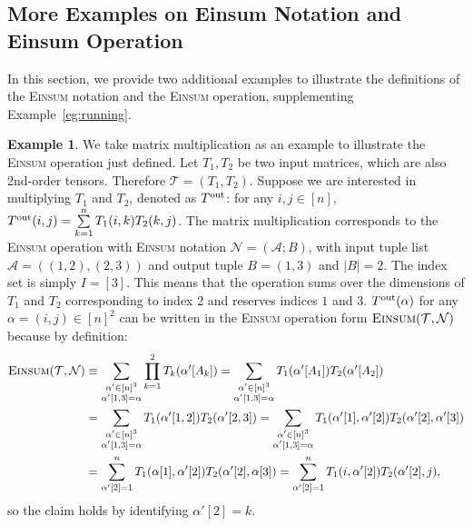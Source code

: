 \documentclass[12pt]{article}
\theoremstyle{plain}
\theoremstyle{definition}
\newtheorem{example}{Example}
\def\Einsum{\textsc{Einsum}}
\newcommand{\tensorcontraction}{\textsc{Einsum}}
\def\calA{\mathcal{A}}
\def\calT{\mathcal{T}}
\def\calN{\mathcal{N}}
\begin{document}
\begin{bibunit}[agsm]

\section{More Examples on Einsum Notation and Einsum Operation}
\label{app:examples}

In this section, we provide two additional examples to illustrate the definitions of the \Einsum{} notation and the \Einsum{} operation, supplementing Example~\ref{eg:running}.

\begin{example}
\label{eg:matrix multiplication}
We take matrix multiplication as an example to illustrate the \Einsum{} operation just defined. Let $T_1, T_2$ be two input matrices, which are also 2nd-order tensors. Therefore $\calT = (T_1, T_2)$. Suppose we are interested in multiplying $T_1$ and $T_2$, denoted as $T^{\rm out}$: for any $i, j \in [n]$, $T^{\rm out} (i, j) = \sum\limits_{k = 1}^n T_{1} (i, k) T_{2} (k, j)$. The matrix multiplication corresponds to the \Einsum{} operation with \Einsum{} notation $\calN = (\calA; B)$, with input tuple list $\calA = ((1,2),(2,3))$ and output tuple $B = (1,3)$ and $|B| = 2$. The index set is simply $I = [3]$. This means that the operation sums over the dimensions of $T_1$ and $T_2$ corresponding to index $2$ and reserves indices $1$ and $3$. $T^{\rm out} (\alpha)$ for any $\alpha = (i, j) \in  [n]^{2}$ can be written in the \Einsum{} operation form $\tensorcontraction(\calT, \calN)$ because by definition:
\begin{align*}
\tensorcontraction(\calT, \calN) & \equiv \sum_{\substack{\alpha'  \in [n]^3 \\ \alpha' [1, 3] = \alpha}} \prod_{k = 1}^{2} T_k (\alpha' [A_k]) = \sum_{\substack{\alpha' 
\in [n]^3 \\ \alpha' [1, 3] = \alpha}} T_1 (\alpha' [A_1]) T_2 (\alpha' [A_2]) \\
& = \sum_{\substack{\alpha'  \in [n]^3 \\ \alpha' [1, 3] = \alpha}} T_1 (\alpha' [1, 2]) T_2 (\alpha' [2, 3]) = \sum_{\substack{\alpha'  \in [n]^3 \\ \alpha' [1, 3] = \alpha}} T_1 (\alpha' [1], \alpha' [2]) T_2 (\alpha' [2], \alpha'[3]) \\
& = \sum_{\alpha' [2] = 1}^{n} T_{1} (\alpha [1], \alpha' [2]) T_{2} (\alpha' [2], \alpha [3]) = \sum_{\alpha' [2] = 1}^{n} T_{1} (i, \alpha' [2]) T_{2} (\alpha' [2], j),
\end{align*}
so the claim holds by identifying $\alpha' [2] = k$.
\end{example}


\end{bibunit}
\end{document}
